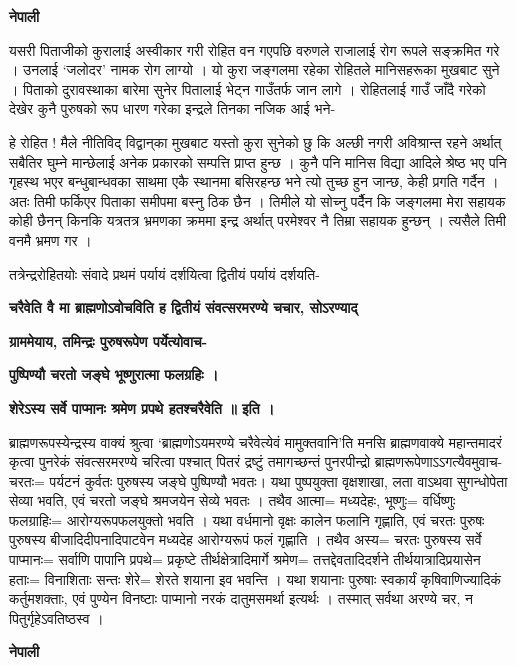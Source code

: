 \documentclass[11pt, a5paper]{article}
\begin{document}
\textbf{नेपाली}

यसरी पिताजीको कुरालाई अस्वीकार गरी रोहित वन गएपछि वरुणले राजालाई रोग रूपले सङ्‍क्रमित गरे । उनलाई ‘जलोदर’ नामक रोग लाग्यो । यो कुरा जङ्‍गलमा रहेका रोहितले मानिसहरूका मुखबाट सुने । पिताको दुरावस्थाका बारेमा सुनेर पितालाई भेट्न गाउँतर्फ जान लागे । रोहितलाई गाउँ जाँदै गरेको देखेर कुनै पुरुषको रूप धारण गरेका इन्द्रले तिनका नजिक आई भने-

हे रोहित ! मैले नीतिविद् विद्वान्‌का मुखबाट यस्तो कुरा सुनेको छु कि अल्छी नगरी अविश्रान्त रहने अर्थात् सबैतिर घुम्ने मान्छेलाई अनेक प्रकारको सम्पत्ति प्राप्त हुन्छ । कुनै पनि मानिस विद्या आदिले श्रेष्ठ भए पनि गृहस्थ भएर बन्धुबान्धवका साथमा एकै स्थानमा बसिरहन्छ भने त्यो तुच्छ हुन जान्छ, केही प्रगति गर्दैन । अतः तिमी फर्किएर पिताका समीपमा बस्नु ठिक छैन । तिमीले यो सोच्नु पर्दैैन कि जङ्‍गलमा मेरा सहायक कोही छैनन् किनकि यत्रतत्र भ्रमणका क्रममा इन्द्र अर्थात् परमेश्वर नै तिम्रा सहायक हुन्छन् । त्यसैले तिमी वनमै भ्रमण गर ।

तत्रेन्द्ररोहितयोः संवादे प्रथमं पर्यायं दर्शयित्वा द्वितीयं पर्यायं दर्शयति-

\textbf{चरैवेति वै मा ब्राह्मणोऽवोचविति ह द्वितीयं संवत्सरमरण्ये चचार, सोऽरण्याद्}

\textbf{ग्राममेयाय, तमिन्द्रः पुरुषरूपेण पर्येत्योवाच-}

\textbf{पुष्पिण्यौ चरतो जङ्‌घे भूष्णुरात्मा फलग्रहिः ।}

\textbf{शेरेऽस्य सर्वे पाप्मानः श्रमेण प्रपथे हतश्चरैवेति ॥ इति ।}

ब्राह्मणरूपस्येन्द्रस्य वाक्यं श्रुत्वा ‘ब्राह्मणोऽयमरण्ये चरैवेत्येवं मामुक्तवानि’ति मनसि ब्राह्मणवाक्ये महान्तमादरं कृत्वा पुनरेकं संवत्सरमरण्ये चरित्वा पश्चात् पितरं द्रष्टुं तमागच्छन्तं पुनरपीन्द्रो ब्राह्मणरूपेणाऽऽगत्यैवमुवाच- चरतः= पर्यटनं कुर्वतः पुरुषस्य जङ्‌घे पुष्पिण्यौ भवतः। यथा पुष्पयुक्ता वृक्षशाखा, लता वाऽथवा सुगन्धोपेता सेव्या भवति, एवं चरतो जङ्‍घे श्रमजयेन सेव्ये भवतः । तथैव आत्मा= मध्यदेहः, भूष्णुः= वर्धिष्णुः फलग्राहिः= आरोग्यरूपफलयुक्तो भवति । यथा वर्धमानो वृक्षः कालेन फलानि गृह्णाति, एवं चरतः पुरुषः पुरुषस्य बीजादिदीपनादिपाटवेन मध्यदेह आरोग्यरूपं फलं गृह्णाति । तथैव अस्य= चरतः पुरुषस्य सर्वे पाप्मानः= सर्वाणि पापानि प्रपथे= प्रकृष्टे तीर्थक्षेत्रादिमार्गे श्रमेण= तत्तद्देवतादिदर्शने तीर्थयात्रादिप्रयासेन हताः= विनाशिताः सन्तः शेरे= शेरते शयाना इव भवन्ति । यथा शयानाः पुरुषाः स्वकार्यं कृषिवाणिज्यादिकं कर्तुमशक्ताः, एवं पुण्येन विनष्टाः पाप्मानो नरकं दातुमसमर्था इत्यर्थः । तस्मात् सर्वथा अरण्ये चर, न पितुर्गृहेऽवतिष्ठस्व ।

\textbf{नेपाली}
\end{document}
